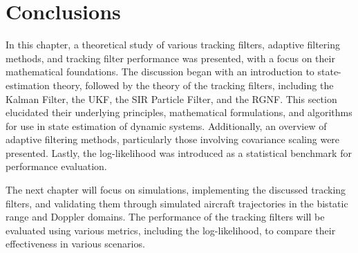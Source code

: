 \section{Conclusions}
In this chapter, a theoretical study of various tracking filters, adaptive filtering methods, and tracking filter performance was presented, with a focus on their mathematical foundations. The discussion began with an introduction to state-estimation theory, followed by the theory of the tracking filters, including the Kalman Filter, the \ac{UKF}, the \ac{SIR} Particle Filter, and the \ac{RGNF}. This section elucidated their underlying principles, mathematical formulations, and algorithms for use in state estimation of dynamic systems. Additionally, an overview of adaptive filtering methods, particularly those involving covariance scaling were presented. Lastly, the log-likelihood was introduced as a statistical benchmark for performance evaluation.

The next chapter will focus on simulations, implementing the discussed tracking filters, and validating them through simulated aircraft trajectories in the bistatic range and Doppler domains. The performance of the tracking filters will be evaluated using various metrics, including the log-likelihood, to compare their effectiveness in various scenarios.
